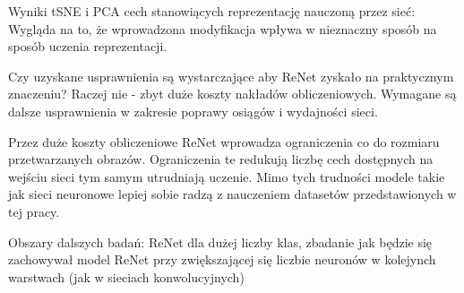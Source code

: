 \documentclass[oneside, mag]{mgr}
\begin{document}
Wyniki tSNE i PCA cech stanowiących reprezentację nauczoną przez sieć: Wygląda na to, że wprowadzona modyfikacja wpływa w nieznaczny sposób na sposób uczenia reprezentacji.

Czy uzyskane usprawnienia są wystarczające aby ReNet zyskało na praktycznym znaczeniu? Raczej nie - zbyt duże koszty nakładów obliczeniowych. Wymagane są dalsze usprawnienia w zakresie poprawy osiągów i wydajności sieci.

Przez duże koszty obliczeniowe ReNet wprowadza ograniczenia co do rozmiaru przetwarzanych obrazów. Ograniczenia te redukują liczbę cech dostępnych na wejściu sieci tym samym utrudniają uczenie. Mimo tych trudności modele takie jak sieci neuronowe lepiej sobie radzą z nauczeniem datasetów przedstawionych w tej pracy.

Obszary dalszych badań:
ReNet dla dużej liczby klas,
zbadanie jak będzie się zachowywał model ReNet przy zwiększającej się liczbie neuronów w kolejynch warstwach (jak w sieciach konwolucyjnych)



\listoffigures
\end{document}
